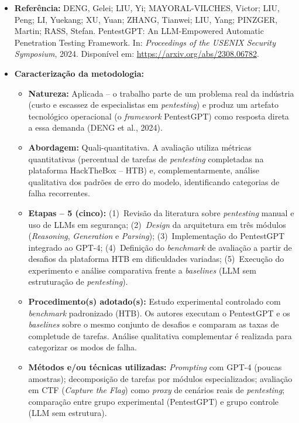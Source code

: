 \documentclass[12pt, a4paper]{article}
\begin{document}
\begin{itemize}

  \item \textbf{Referência:}
  DENG, Gelei; LIU, Yi; MAYORAL-VILCHES, Victor; LIU, Peng; LI, Yuekang; XU, Yuan; ZHANG, Tianwei; LIU, Yang; PINZGER, Martin; RASS, Stefan.
  PentestGPT: An LLM-Empowered Automatic Penetration Testing Framework.
  In: \textit{Proceedings of the USENIX Security Symposium}, 2024.
  Disponível em: \url{https://arxiv.org/abs/2308.06782}.

  \item \textbf{Caracterização da metodologia:}
  \begin{itemize}

    \item[(a)] \textbf{Natureza:} Aplicada -- o trabalho parte de um problema real da indústria (custo e escassez de especialistas em \textit{pentesting}) e produz um artefato tecnológico operacional (o \textit{framework} PentestGPT) como resposta direta a essa demanda (DENG et al., 2024).

    \item[(b)] \textbf{Abordagem:} Quali-quantitativa. A avaliação utiliza métricas quantitativas (percentual de tarefas de \textit{pentesting} completadas na plataforma HackTheBox -- HTB) e, complementarmente, análise qualitativa dos padrões de erro do modelo, identificando categorias de falha recorrentes.

    \item[(c)] \textbf{Etapas -- 5 (cinco):}
    (1)~Revisão da literatura sobre \textit{pentesting} manual e uso de LLMs em segurança;
    (2)~\textit{Design} da arquitetura em três módulos (\textit{Reasoning}, \textit{Generation} e \textit{Parsing});
    (3)~Implementação do PentestGPT integrado ao GPT-4;
    (4)~Definição do \textit{benchmark} de avaliação a partir de desafios da plataforma HTB em dificuldades variadas;
    (5)~Execução do experimento e análise comparativa frente a \textit{baselines} (LLM sem estruturação de \textit{pentesting}).

    \item[(d)] \textbf{Procedimento(s) adotado(s):}
    Estudo experimental controlado com \textit{benchmark} padronizado (HTB). Os autores executam o PentestGPT e os \textit{baselines} sobre o mesmo conjunto de desafios e comparam as taxas de completude de tarefas. Análise qualitativa complementar é realizada para categorizar os modos de falha.

    \item[(e)] \textbf{Métodos e/ou técnicas utilizadas:}
    \textit{Prompting} com GPT-4 (poucas amostras); decomposição de tarefas por módulos especializados; avaliação em CTF (\textit{Capture the Flag}) como \textit{proxy} de cenários reais de \textit{pentesting}; comparação entre grupo experimental (PentestGPT) e grupo controle (LLM sem estrutura).


\end{itemize}
\end{itemize}
\end{document}
